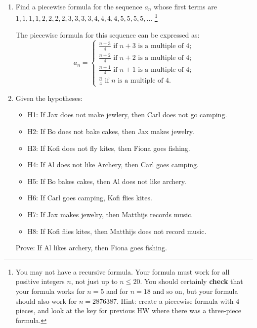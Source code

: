 \documentclass{article}
\begin{document}
\begin{enumerate}

    \item Find a piecewise formula for the sequence $a_n$ whose first terms are\vskip1pt
          $1,1,1,1,2,2,2,2,3,3,3,3,4,4,4,4,5,5,5,5,\dots$\vskip1pt \footnote{You may not
              have a recursive formula. Your formula must work for all positive integers $n$,
              not just up to $n \leq 20$. You should certainly {\bf check} that your formula
              works for $n=5$ and for $n=18$ and so on, but your formula should also work for
              $n=2876387$. Hint: create a piecewise formula with $4$ pieces, and look at the
              key for previous HW where there was a three-piece formula.}

          The piecewise formula for this sequence can be expressed as:
          \[
              a_n = \begin{cases}
                  \frac{n + 3}{4} \text{ if } n + 3 \text{ is a multiple of } 4; \\
                  \frac{n + 2}{4} \text{ if } n + 2 \text{ is a multiple of } 4; \\
                  \frac{n + 1}{4} \text{ if } n + 1 \text{ is a multiple of } 4; \\
                  \frac{n}{4} \text{ if } n \text{ is a multiple of } 4.
              \end{cases}
          \]

          \newpage

    \item Given the hypotheses:
          \begin{itemize}
              \item H1: If Jax does not make jewlery, then Carl does not go camping. 
              \item H2: If Bo does not bake cakes, then Jax makes jewelry. 
              \item H3: If Kofi does not fly kites, then Fiona goes fishing. 
              \item H4: If Al does not like Archery, then Carl goes camping. 
              \item H5: If Bo bakes cakes, then Al does not like archery. 
              \item H6: If Carl goes camping, Kofi flies kites. 
              \item H7: If Jax makes jewelry, then Matthijs records music. 
              \item H8: If Kofi flies kites, then Matthijs does not record music. 
          \end{itemize}
          Prove: If Al likes archery, then Fiona goes fishing.


\end{enumerate}
\end{document}

